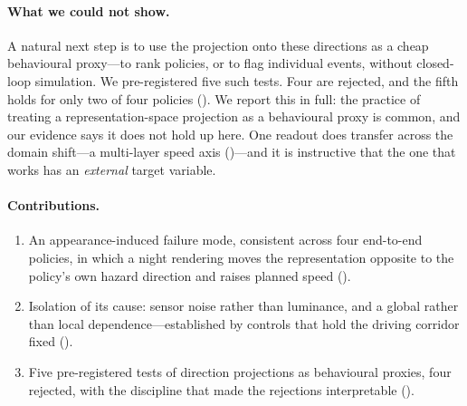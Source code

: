\paragraph{What we could not show.} A natural next step is to use the projection onto these
directions as a cheap behavioural proxy---to rank policies, or to flag individual events,
without closed-loop simulation. We pre-registered five such tests. Four are rejected, and the
fifth holds for only two of four policies (). We report this in full: the
practice of treating a representation-space projection as a behavioural proxy is common, and
our evidence says it does not hold up here. One readout does transfer across the domain
shift---a multi-layer speed axis ()---and it is instructive that the one that
works has an \emph{external} target variable.

\paragraph{Contributions.}
\begin{enumerate}\itemsep2pt
\item An appearance-induced failure mode, consistent across four end-to-end policies, in which
      a night rendering moves the representation opposite to the policy's own hazard direction
      and raises planned speed ().
\item Isolation of its cause: sensor noise rather than luminance, and a global rather than
      local dependence---established by controls that hold the driving corridor fixed
      ().
\item Five pre-registered tests of direction projections as behavioural proxies, four
      rejected, with the discipline that made the rejections interpretable
      ().
\end{enumerate}

